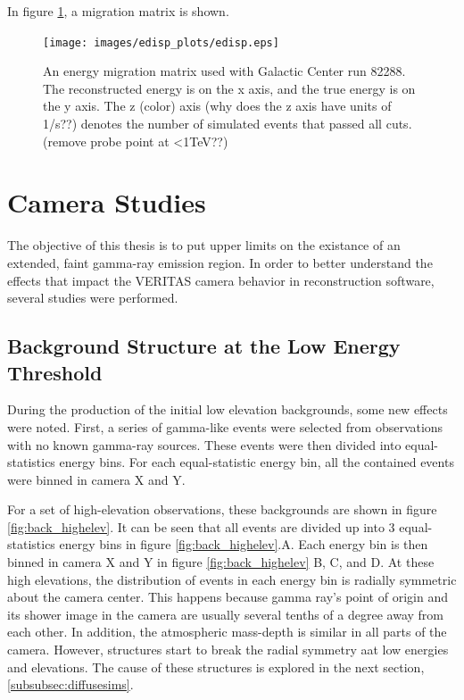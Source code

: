     In figure \ref{fig:migmatrix}, a migration matrix is shown.

    \begin{figure}[ht]
      \begin{center}
        \texttt{[image: images/edisp\_plots/edisp.eps]}
        \caption[Energy Migration Matrix]{An energy migration matrix used with Galactic Center run 82288.  The reconstructed energy is on the x axis, and the true energy is on the y axis.  The z (color) axis (why does the z axis have units of 1/s??) denotes the number of simulated events that passed all cuts. (remove probe point at <1TeV??)}\label{fig:migmatrix}
      \end{center}
    \end{figure}

\section{Camera Studies}
  The objective of this thesis is to put upper limits on the existance of an extended, faint gamma-ray emission region.
  In order to better understand the effects that impact the VERITAS camera behavior in reconstruction software, several studies were performed.

  \subsection{Background Structure at the Low Energy Threshold}
    During the production of the initial low elevation backgrounds, some new effects were noted.
    First, a series of gamma-like events were selected from observations with no known gamma-ray sources.
    These events were then divided into equal-statistics energy bins.
    For each equal-statistic energy bin, all the contained events were binned in camera X and Y.

    For a set of high-elevation observations, these backgrounds are shown in figure \ref{fig:back_highelev}.
    It can be seen that all events are divided up into 3 equal-statistics energy bins in figure \ref{fig:back_highelev}.A.
    Each energy bin is then binned in camera X and Y in figure \ref{fig:back_highelev} B, C, and D.
    At these high elevations, the distribution of events in each energy bin is radially symmetric about the camera center.
    This happens because gamma ray's point of origin and its shower image in the camera are usually several tenths of a degree away from each other.
    In addition, the atmospheric mass-depth is similar in all parts of the camera.
    However, structures start to break the radial symmetry aat low energies and elevations.
    The cause of these structures is explored in the next section, \ref{subsubsec:diffusesims}.


